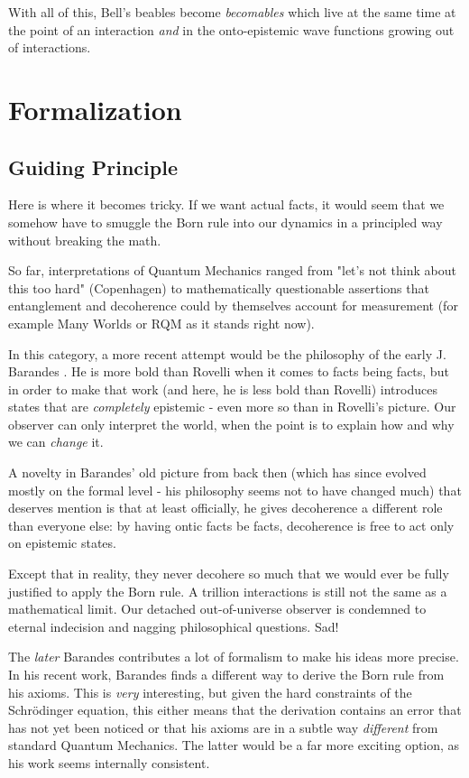\documentclass{article}
\begin{document}
With all of this, Bell's beables \cite{laudisa2023evolutionbellnotionbeable} become \textit{becomables} which live at the same time at the point of an interaction \textit{and} in the onto-epistemic wave functions growing out of interactions.

\section{Formalization}

\subsection{Guiding Principle}

Here is where it becomes tricky. If we want actual facts, it would seem that we somehow have to smuggle the Born rule into our dynamics in a principled way without breaking the math.

So far, interpretations of Quantum Mechanics ranged from "let's not think about this too hard" (Copenhagen) to mathematically questionable assertions that entanglement and decoherence could by themselves account for measurement (for example Many Worlds or RQM as it stands right now).

In this category, a more recent attempt would be the philosophy of the early J. Barandes \cite{barandes2014minimalmodalinterpretationquantum}. He is more bold than Rovelli when it comes to facts being facts, but in order to make that work (and here, he is less bold than Rovelli) introduces states that are \textit{completely} epistemic - even more so than in Rovelli's picture. Our observer can only interpret the world, when the point is to explain how and why we can \textit{change} it.

A novelty in Barandes' old picture from back then (which has since evolved mostly on the formal level - his philosophy seems not to have changed much) that deserves mention is that at least officially, he gives decoherence a different role than everyone else: by having ontic facts be facts, decoherence is free to act only on epistemic states.

Except that in reality, they never decohere so much that we would ever be fully justified to apply the Born rule. A trillion interactions is still not the same as a mathematical limit. Our detached out-of-universe observer is condemned to eternal indecision and nagging philosophical questions. Sad!

The \textit{later} Barandes \cite{Barandes_2025} contributes a lot of formalism to make his ideas more precise. In his recent work, Barandes finds a different way to derive the Born rule from his axioms. This is \textit{very} interesting, but given the hard constraints of the Schrödinger equation, this either means that the derivation contains an error that has not yet been noticed or that his axioms are in a subtle way \textit{different} from standard Quantum Mechanics. The latter would be a far more exciting option, as his work seems internally consistent.
\end{document}
